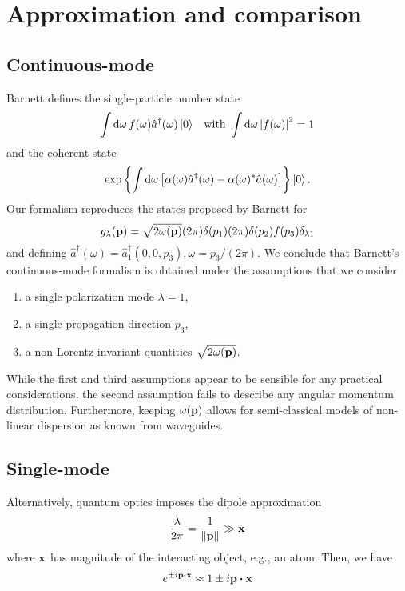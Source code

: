 \section{Approximation and comparison}

\subsection{Continuous-mode}

Barnett defines the single-particle number state~\cite[p.~51]{Barnett2002}
\begin{align}
	\int\dd{\omega}
	f(\omega)
	\hat{a}^\dagger(\omega)
	\ket{0}
	&&
	\text{with}\
	\int\dd{\omega}
	\abs{f(\omega)}^2
	=
	1
\end{align}
and the coherent state~\cite[p.~65]{Barnett2002}
\begin{equation}
	\exp\left\{
		\int\dd{\omega}
		\left[
			\alpha(\omega)
			\hat{a}^\dagger(\omega)
			-
			\alpha(\omega)^*
			\hat{a}(\omega)
		\right]
	\right\}
	\ket{0}
	.
\end{equation}
Our formalism reproduces the states proposed by Barnett for
\begin{equation}
	g_\lambda(\vb{p})
	=
	\sqrt{2\omega(\vb{p})}
	(2\pi)\delta(p_1)
	(2\pi)\delta(p_2)
	f(p_3)
	\delta_{\lambda1}
\end{equation}
and defining $\hat{a}^\dagger(\omega)=\hat{a}_1^\dagger(0,0,p_3),\omega=p_3/(2\pi)$.
We conclude that Barnett's continuous-mode formalism is obtained under the assumptions that we consider
\begin{enumerate}
	\item a single polarization mode $\lambda=1$,
	\item a single propagation direction $p_3$,
	\item a non-Lorentz-invariant quantities $\sqrt{2\omega(\vb{p})}$.
\end{enumerate}
While the first and third assumptions appear to be sensible for any practical considerations, the second assumption fails to describe any angular momentum distribution.
Furthermore, keeping $\omega(\vb{p})$ allows for semi-classical models of non-linear dispersion as known from waveguides.

\subsection{Single-mode}

Alternatively, quantum optics imposes the dipole approximation
\begin{equation}
	\frac{\lambda}{2\pi}
	=
	\frac{1}{\norm{\vb{p}}}
	\gg
	\vb{x}
\end{equation}
where $\vb{x}$ has magnitude of the interacting object, e.g., an atom.
Then, we have
\begin{equation*}
	e^{\pm i\vb{p}\vdot\vb{x}}
	\approx
	1
	\pm
	i\vb{p}\vdot\vb{x}
\end{equation*}